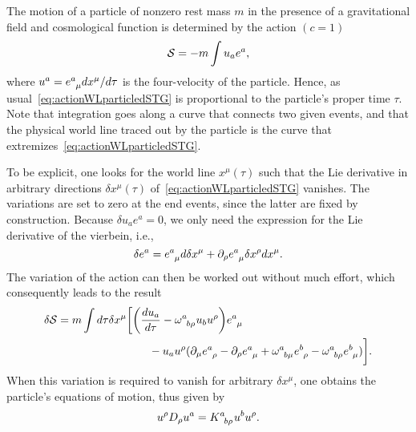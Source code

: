 \documentclass[
final,
11pt,
a4paper,
DIV=11,
headinclude=true,
footinclude=false,
bibliography=totoc,
twoside=true,  %
BCOR=5mm
]{scrbook}
\begin{document}
The motion of a particle of nonzero rest mass $m$ in the presence 
of a gravitational field and cosmological function is determined 
by the action $(c = 1)$
\begin{equation}
\label{eq:actionWLparticledSTG}
  \mathcal{S} = -m \int u_a e^a,
\end{equation}
where $u^a = e\ind{^a_\mu} dx^\mu/d\tau$ is the four-velocity of 
the particle. Hence, as usual~\eqref{eq:actionWLparticledSTG} is 
proportional to the particle's proper time $\tau$. Note that 
integration goes along a curve that connects two given events, 
and that the physical world line traced out by the particle is 
the curve that extremizes~\eqref{eq:actionWLparticledSTG}.

To be explicit, one looks for the world line $x^\mu(\tau)$ such 
that the Lie derivative in arbitrary directions $\delta 
x^\mu(\tau)$ of~\eqref{eq:actionWLparticledSTG} vanishes. The 
variations are set to zero at the end events, since the latter 
are fixed by construction. Because $\delta u_a e^a = 0$, we only 
need the expression for the Lie derivative of the vierbein, i.e.,
\begin{equation}
\label{eq:LieDeriv_vier}
  \delta e^a = e\ind{^a_\mu} d\delta x^\mu + \pd_\rho 
  e\ind{^a_\mu} \delta x^\rho dx^\mu.
\end{equation}
The variation of the action can then be worked out without much 
effort, which consequently leads to the result
\begin{equation*}
\begin{split}
  \delta \mc{S} &= m \int d\tau \delta x^\mu \bigg[ \bigg( 
  \frac{du_a}{d\tau} - \omega\ind{^a_{b\rho}} u_b u^\rho \bigg) 
  e\ind{^a_\mu} \\
  &\nla\hphantom{m \int d\tau \delta x^\mu\hspace{2em}}
  - u_a u^\rho ( \pd_\mu e\ind{^a_\rho} - \pd_\rho e\ind{^a_\mu} 
  + \omega\ind{^a_{b\mu}} e\ind{^b_\rho} - \omega\ind{^a_{b\rho}} 
  e\ind{^b_\mu}) \bigg].
\end{split}
\end{equation*}
When this variation is required to vanish for arbitrary $\delta 
x^\mu$, one obtains the particle's equations of motion, thus 
given by
\begin{equation}
\label{eq:partEOM_dStg}
  u^\rho D_\rho u^a = K\ind{^a_{b\rho}} u^b u^\rho.
\end{equation}
\end{document}
